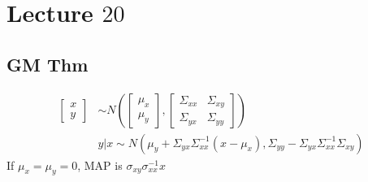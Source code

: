 \documentclass{article}
\begin{document}
\section{Lecture $20$} 

\subsection{GM Thm}
\begin{align*}
\begin{bmatrix} x \\ y \end{bmatrix} &  \sim  N\left(\begin{bmatrix} \mu_{x} \\ \mu_{y} \end{bmatrix} , \begin{bmatrix} \Sigma_{x x} & \Sigma_{xy} \\ \Sigma_{yx} & \Sigma_{yy} \end{bmatrix} \right)
\\ &y  | x \sim  N\left(\mu_{y} + \Sigma_{yx} \Sigma_{x x}^{-1} \left(x - \mu_{x}\right), \Sigma_{yy} - \Sigma_{yx} \Sigma_{x x}^{-1} \Sigma_{xy} \right)
\end{align*}
If $\mu_{x} = \mu_{y} = 0$, MAP is $\sigma_{xy} \sigma_{x x}^{-1} x $
\end{document}
